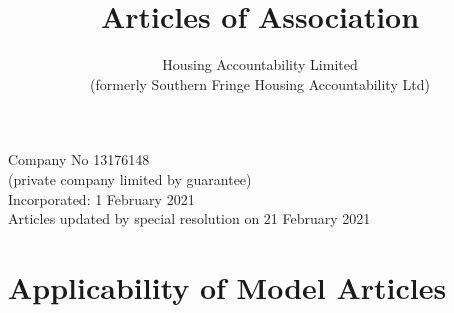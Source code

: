 \documentclass[12pt]{article}
\newcommand{\Name}[0]{Housing Accountability Limited}
\begin{document}
\title{
Articles of Association\\
}
\author{\Name{}\\
(formerly Southern Fringe Housing Accountability Ltd)
}
\date{}

\maketitle

\begin{center}
Company No 13176148\\
(private company limited by guarantee)\\
\medskip
Incorporated: 1 February 2021 \\
Articles updated by special resolution on 21 February 2021
\end{center}


\section{Applicability of Model Articles}
\end{document}
